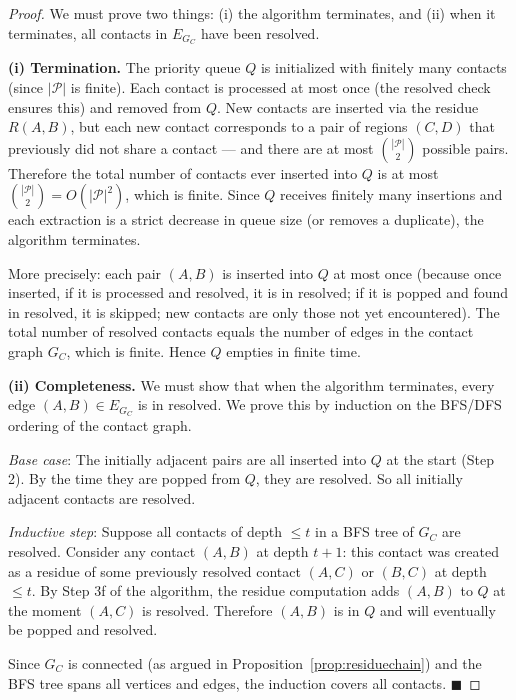 \documentclass[twocolumn]{article}
\theoremstyle{plain}
\theoremstyle{definition}
\newcommand{\PP}{\mathcal{P}}
\newcommand{\GC}{G_C}
\newcommand{\qed}{\hfill$\blacksquare$}
\begin{document}
\begin{proof}
We must prove two things: (i) the algorithm terminates, and (ii) when it
terminates, all contacts in $E_{G_C}$ have been resolved.

\textbf{(i) Termination.} The priority queue $Q$ is initialized with finitely
many contacts (since $|\PP|$ is finite). Each contact is processed at most once
(the resolved check ensures this) and removed from $Q$. New contacts are inserted
via the residue $R(A,B)$, but each new contact corresponds to a pair of regions
$(C,D)$ that previously did not share a contact --- and there are at most
$\binom{|\PP|}{2}$ possible pairs. Therefore the total number of contacts ever
inserted into $Q$ is at most $\binom{|\PP|}{2} = O(|\PP|^2)$, which is finite.
Since $Q$ receives finitely many insertions and each extraction is a strict
decrease in queue size (or removes a duplicate), the algorithm terminates.

More precisely: each pair $(A,B)$ is inserted into $Q$ at most once (because once
inserted, if it is processed and resolved, it is in resolved; if it is popped and
found in resolved, it is skipped; new contacts are only those not yet encountered).
The total number of resolved contacts equals the number of edges in the contact
graph $\GC$, which is finite. Hence $Q$ empties in finite time.

\textbf{(ii) Completeness.} We must show that when the algorithm terminates,
every edge $(A,B) \in E_{G_C}$ is in resolved. We prove this by induction on
the BFS/DFS ordering of the contact graph.

\emph{Base case}: The initially adjacent pairs are all inserted into $Q$ at the
start (Step 2). By the time they are popped from $Q$, they are resolved. So all
initially adjacent contacts are resolved.

\emph{Inductive step}: Suppose all contacts of depth $\leq t$ in a BFS tree of
$\GC$ are resolved. Consider any contact $(A,B)$ at depth $t+1$: this contact
was created as a residue of some previously resolved contact $(A,C)$ or $(B,C)$
at depth $\leq t$. By Step 3f of the algorithm, the residue computation adds
$(A,B)$ to $Q$ at the moment $(A,C)$ is resolved. Therefore $(A,B)$ is in $Q$
and will eventually be popped and resolved.

Since $\GC$ is connected (as argued in Proposition~\ref{prop:residuechain}) and
the BFS tree spans all vertices and edges, the induction covers all contacts. \qed
\end{proof}
\end{document}
